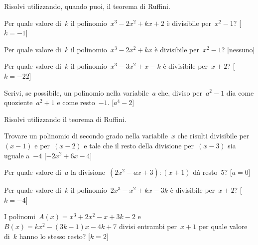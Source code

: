 \begin{esercizio}[\Ast]
\label{ese:div.006}
Risolvi utilizzando, quando puoi, il teorema di Ruffini.
 \begin{enumeratea}
 \item Per quale valore di~$k$ il polinomio~$x^{3}-2x^{2}+kx+2$ 
  è divisibile per~$x^{2}-1$? \hfill[$k=-1$]
 \item Per quale valore di~$k$ il polinomio~$x^{3}-2x^{2}+kx$ 
  è divisibile per~$x^{2}-1$? \hfill[nessuno]
 \item Per quale valore di~$k$ il polinomio~$x^{3}-3x^{2}+x-k$ 
  è divisibile per~$x+2$? \hfill[$k=-22$]
 \item Scrivi, se possibile, un polinomio nella variabile~$a$ che, 
  diviso per~$a^{2}-1$ dia come quoziente~$a^{2}+1$ e 
  come resto~$-1$. \hfill \mbox{[\(a^{4}-2\)]} %
 \end{enumeratea}
\end{esercizio}

\begin{esercizio}[\Ast]
\label{ese:div.007}
Risolvi utilizzando il teorema di Ruffini.
 \begin{enumeratea}
 \item Trovare un polinomio di secondo grado nella variabile~$x$ che risulti 
  divisibile per~$(x-1)$ e per~$(x-2)$ e tale che il resto della divisione 
  per~$(x-3)$ sia uguale a~$-4$ \hfill[$-2x^2+6x-4$]
 \item Per quale valore di~$a$ la 
  divisione~$\left(2x^{2}-ax+3\right):(x+1)$ dà resto~$5$? \hfill[$a=0$]
 \item Per quale valore di~$k$ il 
  polinomio~$2x^{3}-x^{2}+kx-3k$ è divisibile per~$x+2$? \hfill[$k=-4$]
 \item I polinomi~$A(x)=x^3+2x^2-x+3k-2$ e~$B(x)=kx^2-(3k-1)x-4k+7$ 
  divisi entrambi per~$x+1$ per quale valore di~$k$ hanno lo stesso resto? 
  \hfill[$k=2$]
 \end{enumeratea}
\end{esercizio}

\subsubsection*{}

